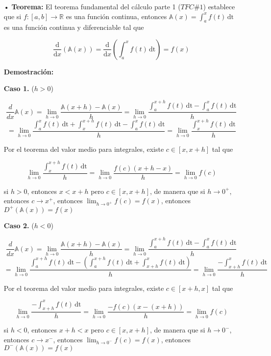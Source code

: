 \documentclass[pts12]{article}
\numberwithin{equation}{section}
\newcommand{\Col}{\color{ProcessBlue}}
\newcommand{\derivate}[2]{\frac{\mathrm{d}}{\mathrm{d}#1} \left(  {#2}  \right)  }
\begin{document}
\begin{itemize}

\item[\Col •] \textbf{Teorema:} El teorema fundamental del cálculo parte 1 ($TFC \#1$) establece que si $f:[a,b]\longrightarrow\mathbb{R}$ es una función continua, entonces $\mathbb{A}(x)=\int_{a}^{x} \! {f(t)} \, \mathrm{dt}$ es una función continua y diferenciable tal que

$$ \derivate{x}{\mathbb{A}(x)}=\derivate{x}{\int_{a}^{x} \! {f(t)} \, \mathrm{dt}}=f(x) $$ 

\textbf{Demostración:}

\textbf{Caso 1.} ($h>0$)

$$ \frac{d}{dx}\mathbb{A}(x)=\lim_{h\to 0}\frac{\mathbb{A}(x+h)-\mathbb{A}(x)}{h}= \lim_{h\to 0}\frac{  \int_{a}^{x+h} \! {f(t)} \, \mathrm{dt} - \int_{a}^{x} \! {f(t)} \, \mathrm{dt} }{h}$$
$$= \lim_{h\to 0}\frac{  \int_{a}^{x} \! {f(t)} \, \mathrm{dt} + \int_{x}^{x+h} \! {f(t)} \, \mathrm{dt} - \int_{a}^{x} \! {f(t)} \, \mathrm{dt} }{h}=\lim_{h\to 0} \frac{\int_{x}^{x+h} \! {f(t)} \, \mathrm{dt}}{h} $$

Por el teorema del valor medio para integrales, existe $c\in [x,x+h]$ tal que 

$$\lim_{h\to 0} \frac{\int_{x}^{x+h} \! {f(t)} \, \mathrm{dt}}{h}=\lim_{h\to 0}\frac{f(c)(x+h-x)}{h}=\lim_{h\to 0}f(c)$$

si $h>0$, entonces $x<x+h$ pero $c\in [x,x+h]$, de manera que si $h\longrightarrow 0^+$, entonces $c\longrightarrow x^+$, entonces $\lim_{h\to 0^+}f(c)=f(x)$, entonces $D^+(\mathbb{A}(x))=f(x)$

\textbf{Caso 2.} ($h<0$)

$$ \frac{d}{dx}\mathbb{A}(x)=\lim_{h\to 0}\frac{\mathbb{A}(x+h)-\mathbb{A}(x)}{h}= \lim_{h\to 0}\frac{  \int_{a}^{x+h} \! {f(t)} \, \mathrm{dt} - \int_{a}^{x} \! {f(t)} \, \mathrm{dt} }{h}$$
$$= \lim_{h\to 0}\frac{  \int_{a}^{x+h} \! {f(t)} \, \mathrm{dt} -\left( \int_{a}^{x+h} \! {f(t)} \, \mathrm{dt} + \int_{x+h}^{x} \! {f(t)} \, \mathrm{dt} \right)}{h}=\lim_{h\to 0} \frac{-\int_{x+h}^{x} \! {f(t)} \, \mathrm{dt}}{h} $$

Por el teorema del valor medio para integrales, existe $c\in [x+h,x]$ tal que 

$$\lim_{h\to 0} \frac{-\int_{x+h}^{x} \! {f(t)} \, \mathrm{dt}}{h}=\lim_{h\to 0}\frac{-f(c)(x-(x+h))}{h}=\lim_{h\to 0}f(c)$$

si $h<0$, entonces $x+h<x$ pero $c\in [x,x+h]$, de manera que si $h\longrightarrow 0^-$, entonces $c\longrightarrow x^-$, entonces $\lim_{h\to 0^-}f(c)=f(x)$, entonces $D^-(\mathbb{A}(x))=f(x)$


\end{itemize}
\end{document}
